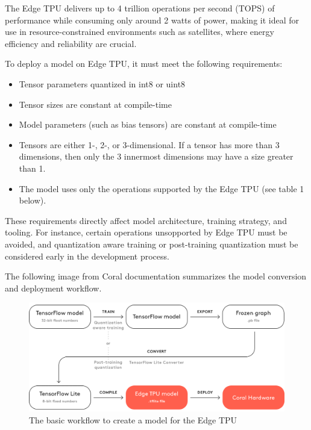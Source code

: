 {The Edge TPU delivers up to 4 trillion operations per second (TOPS) of performance while consuming only around 2 watts of power,
making it ideal for use in resource-constrained environments such as satellites, where energy efficiency and reliability are crucial.

To deploy a model on Edge TPU, it must meet the following requirements:
\begin{itemize}
    \item Tensor parameters quantized in \gls{int8} or \gls{uint8}
    \item Tensor sizes are constant at compile-time
    \item Model parameters (such as bias tensors) are constant at compile-time
    \item Tensors are either 1-, 2-, or 3-dimensional. If a tensor has more than 3 dimensions, then only the 3 innermost dimensions may have a size greater than 1.
    \item The model uses only the operations supported by the Edge TPU (see table 1 below). 
\end{itemize}

These requirements directly affect model architecture, training strategy, and tooling. For instance, certain operations unsopported by Edge TPU must be avoided,
and quantization aware training or post-training quantization must be considered early in the development process.

The following image from Coral documentation summarizes the model conversion and deployment workflow.

\begin{figure}[H]
  \centering
  \includegraphics[width=\textwidth]{files/Edge_TPU_quantization.png}
  \caption{The basic workflow to create a model for the Edge TPU}
  \label{fig:quantization-chart}
\end{figure}

}
